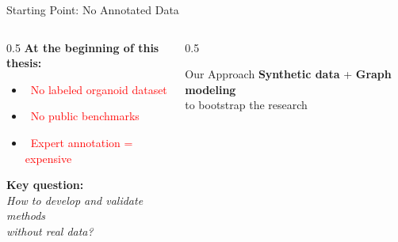 \documentclass[aspectratio=169]{beamer}
\begin{document}
\begin{frame}{Starting Point: No Annotated Data}
    \begin{columns}
        \begin{column}{0.5\textwidth}
            \textbf{At the beginning of this thesis:}
            \begin{itemize}
                \item \textcolor{red}{\faTimes\ No labeled organoid dataset}
                \item \textcolor{red}{\faTimes\ No public benchmarks}
                \item \textcolor{red}{\faTimes\ Expert annotation = expensive}
            \end{itemize}
    
    \vspace{1em}
            \textbf{Key question:}\\
            \textit{How to develop and validate methods\\without real data?}
        \end{column}
        \begin{column}{0.5\textwidth}
    \begin{center}
    \end{center}
            
            \vspace{0.5em}
            \begin{block}{Our Approach}
                \textbf{Synthetic data} + \textbf{Graph modeling}\\to bootstrap the research
            \end{block}
        \end{column}
    \end{columns}
\end{frame}
\end{document}
